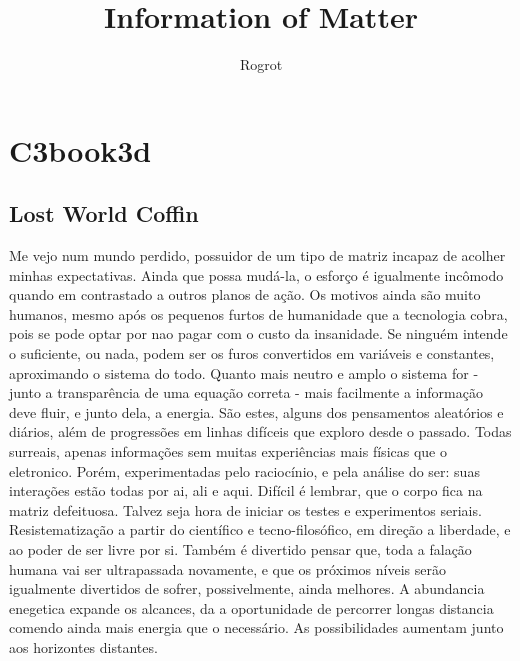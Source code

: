 \documentclass[a4paper,11pt]{book}
\title{Information of Matter}
\author{Rogrot}
\begin{document}
\maketitle
\tableofcontents

\chapter{C3book3d}
\section{Lost World Coffin}
  Me vejo num mundo perdido, possuidor de um tipo de matriz incapaz de acolher minhas expectativas. Ainda que possa mudá-la, o esforço é igualmente incômodo quando em contrastado a outros planos de ação.
	Os motivos ainda são muito humanos, mesmo após os pequenos furtos de humanidade que a tecnologia cobra, pois se pode optar por nao pagar com o custo da insanidade.
	Se ninguém intende o suficiente, ou nada, podem ser os furos convertidos em variáveis e constantes, aproximando o sistema do todo. Quanto mais neutro e amplo o sistema for - junto a transparência de uma equação correta - mais facilmente a informação deve fluir, e junto dela, a energia.
	São estes, alguns dos pensamentos aleatórios e diários, além de progressões em linhas difíceis que exploro desde o passado. Todas surreais, apenas informações sem muitas experiências mais físicas que o eletronico. Porém, experimentadas pelo raciocínio, e pela análise do ser: suas interações estão todas por ai, ali e aqui. 
	Difícil é lembrar, que o corpo fica na matriz defeituosa. Talvez seja hora de iniciar os testes e experimentos seriais. Resistematização a partir do científico e tecno-filosófico, em direção a liberdade, e ao poder de ser livre por si.
 	Também é divertido pensar que, toda a falação humana vai ser ultrapassada novamente, e que os próximos níveis serão igualmente divertidos de sofrer, possivelmente, ainda melhores. A abundancia enegetica expande os alcances, da a oportunidade de percorrer longas distancia comendo ainda mais energia que o necessário. As possibilidades aumentam junto aos horizontes distantes.
 	\linebreak
\end{document}
